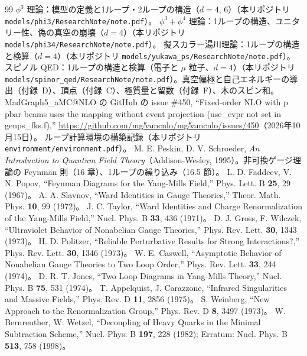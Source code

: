 \documentclass[a4paper,10pt]{ltjsarticle}
\begin{document}
\begin{thebibliography}{99}
 $\phi^3$ 理論：模型の定義と1ループ・2ループの構造（$d=4,\,6$）（本リポジトリ \nolinkurl{models/phi3/ResearchNote/note.pdf}）。
 $\phi^3+\phi^4$ 理論：1ループの構造、ユニタリー性、偽の真空の崩壊（$d=4$）（本リポジトリ \nolinkurl{models/phi34/ResearchNote/note.pdf}）。
 擬スカラー湯川理論：1ループの構造と検算（$d=4$）（本リポジトリ \nolinkurl{models/yukawa_ps/ResearchNote/note.pdf}）。
 スピノル QED：1ループの構造と検算（電子と $\mu$ 粒子、$d=4$）（本リポジトリ \nolinkurl{models/spinor_qed/ResearchNote/note.pdf}）。真空偏極と自己エネルギーの導出（付録~D）、頂点（付録~C）、極質量と留数（付録~F）、木のスピン和。
 MadGraph5\_aMC@NLO の GitHub の issue \#450, ``Fixed-order NLO with p pbar beams uses the mapping without event projection (use\_evpr not set in genps\_fks.f),'' \url{https://github.com/mg5amcnlo/mg5amcnlo/issues/450}（2026年10月15日）。
 ループ計算環境の構築記録（本リポジトリ \nolinkurl{environment/environment.pdf}）。
 M. E. Peskin, D. V. Schroeder, \textit{An Introduction to Quantum Field Theory}（Addison-Wesley, 1995）。非可換ゲージ理論の Feynman 則（16 章）、1ループの繰り込み（16.5 節）。
 L. D. Faddeev, V. N. Popov, ``Feynman Diagrams for the Yang-Mills Field,'' Phys. Lett. B \textbf{25}, 29 (1967)。
 A. A. Slavnov, ``Ward Identities in Gauge Theories,'' Theor. Math. Phys. \textbf{10}, 99 (1972)。
 J. C. Taylor, ``Ward Identities and Charge Renormalization of the Yang-Mills Field,'' Nucl. Phys. B \textbf{33}, 436 (1971)。
 D. J. Gross, F. Wilczek, ``Ultraviolet Behavior of Nonabelian Gauge Theories,'' Phys. Rev. Lett. \textbf{30}, 1343 (1973)。
 H. D. Politzer, ``Reliable Perturbative Results for Strong Interactions?,'' Phys. Rev. Lett. \textbf{30}, 1346 (1973)。
 W. E. Caswell, ``Asymptotic Behavior of Nonabelian Gauge Theories to Two Loop Order,'' Phys. Rev. Lett. \textbf{33}, 244 (1974)。
 D. R. T. Jones, ``Two Loop Diagrams in Yang-Mills Theory,'' Nucl. Phys. B \textbf{75}, 531 (1974)。
 T. Appelquist, J. Carazzone, ``Infrared Singularities and Massive Fields,'' Phys. Rev. D \textbf{11}, 2856 (1975)。
 S. Weinberg, ``New Approach to the Renormalization Group,'' Phys. Rev. D \textbf{8}, 3497 (1973)。
 W. Bernreuther, W. Wetzel, ``Decoupling of Heavy Quarks in the Minimal Subtraction Scheme,'' Nucl. Phys. B \textbf{197}, 228 (1982); Erratum: Nucl. Phys. B \textbf{513}, 758 (1998)。

\end{thebibliography}
\end{document}
